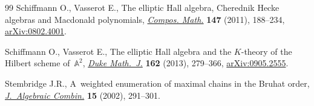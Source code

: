 \begin{thebibliography}{99}
Schiffmann O., Vasserot E., The elliptic {H}all algebra, {C}herednik {H}ecke
 algebras and {M}acdonald polynomials,
 \href{https://doi.org/10.1112/S0010437X10004872}{\textit{Compos. Math.}}
 \textbf{147} (2011), 188--234,
 \href{http://arxiv.org/abs/0802.4001}{arXiv:0802.4001}.

Schiffmann O., Vasserot E., The elliptic {H}all algebra and the {$K$}-theory of
 the {H}ilbert scheme of~{${\mathbb A}^2$},
 \href{https://doi.org/10.1215/00127094-1961849}{\textit{Duke Math.~J.}}
 \textbf{162} (2013), 279--366,
 \href{http://arxiv.org/abs/0905.2555}{arXiv:0905.2555}.

Stembridge J.R., A~weighted enumeration of maximal chains in the {B}ruhat
 order, \href{https://doi.org/10.1023/A:1015068609503}{\textit{J.~Algebraic
 Combin.}} \textbf{15} (2002), 291--301.

\end{thebibliography}
